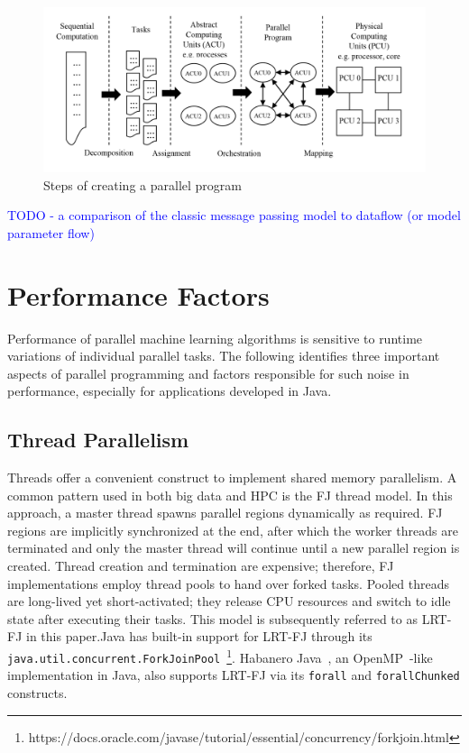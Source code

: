 \documentclass[10pt, conference, compsocconf]{IEEEtran}
\begin{document}
\begin{figure}[!h]
\centering
\includegraphics[width=0.9\columnwidth]{images/fig_parallel_decompose}
\caption{Steps of creating a parallel program
\label{fig:fig_steps_of_creating_a_parallel_program}}
\end{figure}

\textcolor{blue}{TODO - a comparison of the classic message passing model to dataflow (or model parameter flow)}

\section{Performance Factors} \label{sec:factors}

Performance of parallel machine learning algorithms is sensitive to runtime variations of individual parallel tasks. The following identifies three important aspects of parallel programming and factors responsible for such noise in performance, especially for applications developed in Java.

\subsection{Thread Parallelism}
Threads offer a convenient construct to implement shared memory parallelism. A common pattern used in both big data and \ac{HPC} is the \ac{FJ} thread model. In this approach, a master thread spawns parallel regions dynamically as required. \ac{FJ} regions are implicitly synchronized at the end, after which the worker threads are terminated and only the master thread will continue until a new parallel region is created. Thread creation and termination are expensive; therefore, \ac{FJ} implementations employ thread pools to hand over forked tasks. Pooled threads are long-lived yet short-activated; they release \acs{CPU} resources and switch to idle state after executing their tasks. This model is subsequently referred to as \ac{LRT-FJ} in this paper.Java has built-in support for \ac{LRT-FJ} through its \texttt{java.util.concurrent.ForkJoinPool}~\footnote{https://docs.oracle.com/javase/tutorial/essential/concurrency/forkjoin.html}. Habanero Java~\cite{Imam:2014:HLJ:2647508.2647514}, an OpenMP~\cite{Dagum:1998:OIA:615255.615542}-like implementation in Java, also supports \ac{LRT-FJ} via its \texttt{forall} and \texttt{forallChunked} constructs.
\end{document}

